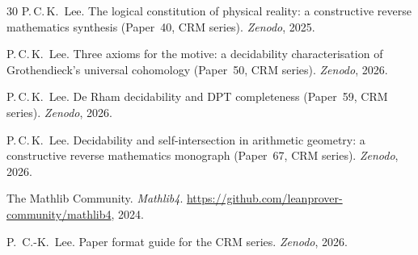 \documentclass[11pt]{article}
\theoremstyle{plain}
\theoremstyle{definition}
\theoremstyle{remark}
\begin{document}
\begin{thebibliography}{30}
P.\,C.\,K.~Lee.
\newblock The logical constitution of physical reality:
a constructive reverse mathematics synthesis
(Paper~40, CRM series).
\newblock \textit{Zenodo}, 2025.

P.\,C.\,K.~Lee.
\newblock Three axioms for the motive: a decidability characterisation
of Grothendieck's universal cohomology
(Paper~50, CRM series).
\newblock \textit{Zenodo}, 2026.

P.\,C.\,K.~Lee.
\newblock De Rham decidability and DPT completeness
(Paper~59, CRM series).
\newblock \textit{Zenodo}, 2026.

P.\,C.\,K.~Lee.
\newblock Decidability and self-intersection in arithmetic geometry:
a constructive reverse mathematics monograph
(Paper~67, CRM series).
\newblock \textit{Zenodo}, 2026.

The Mathlib Community.
\newblock \textit{Mathlib4}.
\newblock \url{https://github.com/leanprover-community/mathlib4}, 2024.

P.~C.-K.~Lee.
\newblock Paper format guide for the CRM series.
\newblock \textit{Zenodo}, 2026.

\end{thebibliography}
\end{document}

